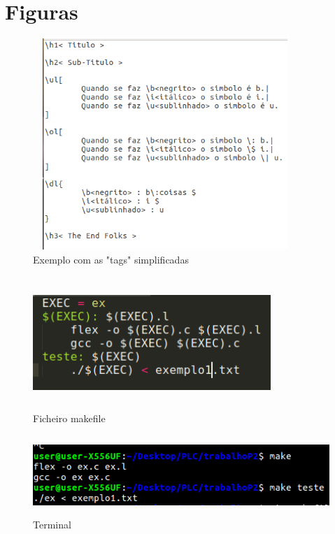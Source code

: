 \documentclass{report}
\begin{document}
\chapter{Figuras}
\begin{figure}[h]
\centering
\includegraphics[width=10cm,height= 8cm]{exemplo1.png}
\caption{Exemplo com as "tags" simplificadas}
\label{Exemplo 1}
\end{figure}
\begin{figure}[h]
\centering
\includegraphics[width=9cm,height= 5cm]{makefile.png}
\caption{Ficheiro makefile}
\label{makefile}
\end{figure}
\begin{figure}[h]
\centering
\includegraphics[width=15cm,height= 3cm]{terminal.png}
\caption{Terminal}
\label{Terminal}
\end{figure}
\end{document}
